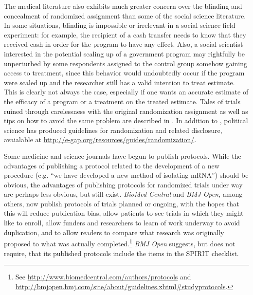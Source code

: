 \documentclass[12pt] {article}
\begin{document}
The medical literature also exhibits much greater concern over the blinding and concealment of randomized assignment than some of the social science literature. In some situations, blinding is impossible or irrelevant in a social science field experiment: for example, the recipient of a cash transfer needs to know that they received cash in order for the program to have any effect. Also, a social scientist interested in the potential scaling up of a government program may rightfully be unperturbed by some respondents assigned to the control group somehow gaining access to treatment, since this behavior would undoubtedly occur if the program were scaled up and the researcher still has a valid intention to treat estimate.  This is clearly not always the case, especially if one wants an accurate estimate of the efficacy of a program or a treatment on the treated estimate. Tales of trials ruined through carelessness with the original randomization assignment as well as tips on how to avoid the same problem are described in \cite{schulz_allocation_2002}. In addition to \cite{bruhn_pursuit_2009}, political science has produced guidelines for randomization and related disclosure, avaialable at \url{http://e-gap.org/resources/guides/randomization/}.


 Some medicine and science journals have begun to publish protocols.   While the
advantages of publishing a protocol related to the development of a new
procedure (e.g. ``we have developed a new method of isolating mRNA'')
should be obvious, the advantages of publishing protocols for randomized
trials under way are perhaps less obvious, but still exist. \emph{BioMed
Central} and \emph{BMJ Open}, among others, now publish protocols of
trials planned or ongoing, with the hopes that this will reduce
publication bias, allow patients to see trials in which they might like
to enroll, allow funders and researchers to learn of work underway to
avoid duplication, and to allow readers to compare what research was
originally proposed to what was actually completed.\footnote{See
\url{http://www.biomedcentral.com/authors/protocols} and
\url{http://bmjopen.bmj.com/site/about/guidelines.xhtml\#studyprotocols}.}
\emph{BMJ Open} suggests, but does not require, that its published
protocols include the items in the SPIRIT checklist.
\end{document}
